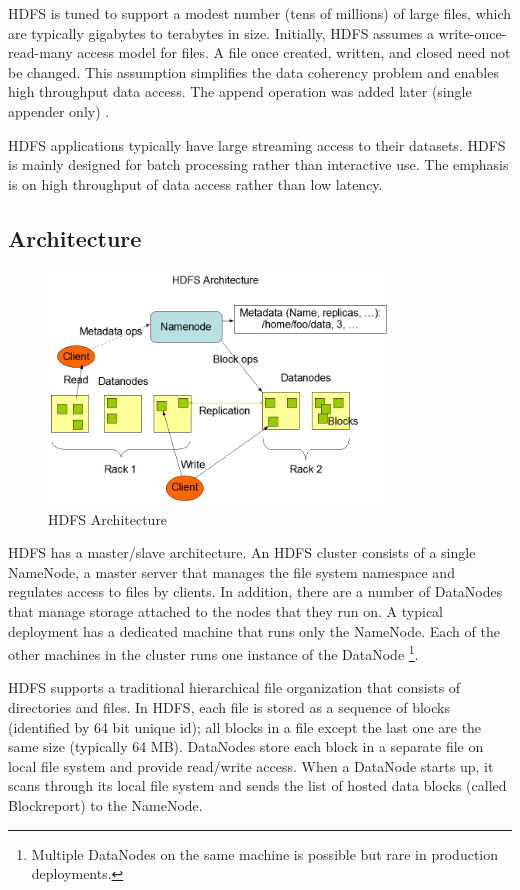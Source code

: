 \documentclass[11pt]{book}
\begin{document}
HDFS is tuned to support a modest number (tens of millions) of large files, which are typically gigabytes to terabytes in size. Initially, 
HDFS assumes a write-once-read-many access model for files. A file once created, written, and closed need not be changed. This assumption simplifies the data coherency problem and enables high throughput data access. The append operation was added later (single appender only) \cite{HDFS2010:265}.

HDFS applications typically have large streaming access to their datasets. HDFS is mainly designed for batch processing rather than interactive use. The emphasis is on high throughput of data access rather than low latency. 

\subsection{Architecture}
\begin{figure}[t]
\includegraphics[width=0.8\textwidth]{images/hdfs-architecture.png}
\centering
\caption{HDFS Architecture}
\end{figure}

HDFS has a master/slave architecture. An HDFS cluster consists of a single NameNode, a master server that manages the file system namespace and regulates access to files by clients. In addition, there are a number of DataNodes that manage storage attached to the nodes that they run on. A typical deployment has a dedicated machine that runs only the NameNode. Each of the other machines in the cluster runs one instance of the DataNode \footnote{Multiple DataNodes on the same machine is possible but rare in production deployments.}.

HDFS supports a traditional hierarchical file organization that consists of directories and files. In HDFS, each file is stored as a sequence of blocks (identified by 64 bit unique id); all blocks in a file except the last one are the same size (typically 64 MB). DataNodes store each block in a separate file  on local file system and provide read/write access. When a DataNode starts up, it scans through its local file system and sends the list of hosted data blocks (called Blockreport) to the NameNode.
\end{document}
